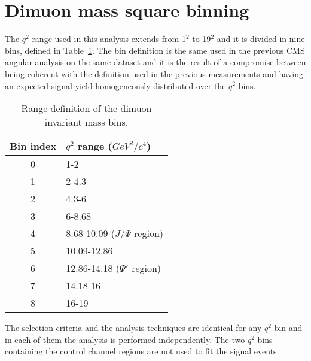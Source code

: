 \section{Dimuon mass square binning}
\label{sec:q2}


The $q^2$ range used in this analysis extends from 1\GeV$^2$ to 19\GeV$^2$ and it is divided in nine bins, defined in Table~\ref{tab:q2bins}.
The bin definition is the same used in the previous CMS angular analysis on the same dataset and it is the result of a compromise between being coherent with the definition used in the previous measurements and having an expected signal yield homogeneously distributed over the $q^2$ bins.

\begin{table}[!htb]
  \begin{center}
    \begin{small}
      \caption{Range definition of the dimuon invariant mass bins.
        \label{tab:q2bins}}
      \begin{tabular}{c|l}
        Bin index & $q^2$ range ($GeV^2/c^4$) \\
        \hline
        0 & 1-2  \\
        1 & 2-4.3  \\
        2 & 4.3-6  \\
        3 & 6-8.68   \\
        4 & 8.68-10.09 ($J/\Psi$ region) \\
        5 & 10.09-12.86\\
        6 & 12.86-14.18 ($\Psi'$ region)\\
        7 & 14.18-16\\
        8 & 16-19\\
      \end{tabular}
    \end{small}
  \end{center}
\end{table}

The selection criteria and the analysis techniques are identical for any $q^2$ bin and in each of them the analysis is performed independently.
The two $q^2$ bins containing the control channel regions are not used to fit the signal events.


  
